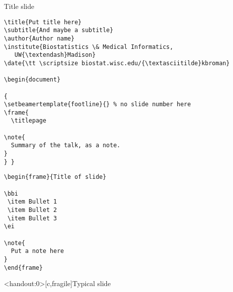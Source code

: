 \documentclass[12pt,t]{beamer}
\begin{document}
\begin{frame}[c,fragile]{Title slide}

\begin{lstlisting}
\title{Put title here}
\subtitle{And maybe a subtitle}
\author{Author name}
\institute{Biostatistics \& Medical Informatics,
   UW{\textendash}Madison}
\date{\tt \scriptsize biostat.wisc.edu/{\textasciitilde}kbroman}

\begin{document}

{
\setbeamertemplate{footline}{} % no slide number here
\frame{
  \titlepage

\note{
  Summary of the talk, as a note.
}
} }
\end{lstlisting}

\end{frame}


\newsavebox{\codeboxone}
\begin{lrbox}{\codeboxone}
\begin{lstlisting}
\begin{frame}{Title of slide}

\bbi
 \item Bullet 1
 \item Bullet 2
 \item Bullet 3
\ei

\note{
  Put a note here
}
\end{frame}
\end{lstlisting}
\end{lrbox}

\begin{frame}<handout:0>[c,fragile]{Typical slide}

\usebox{\codeboxone}

\end{frame}
\end{document}
